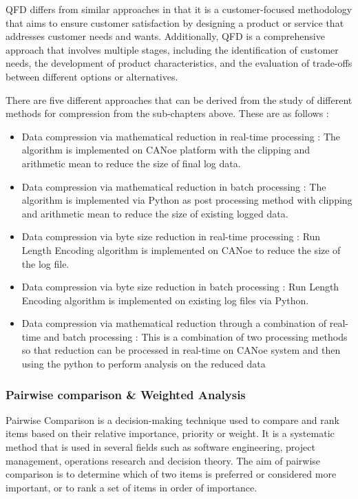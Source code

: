 QFD differs from similar approaches in that it is a customer-focused methodology that aims to ensure customer satisfaction by designing a product or service that addresses customer needs and wants. Additionally, QFD is a comprehensive approach that involves multiple stages, including the identification of customer needs, the development of product characteristics, and the evaluation of trade-offs between different options or alternatives.

There are five different approaches that can be derived from the study of different methods for compression from the sub-chapters above. These are as follows : 

\begin{itemize}
    \item Data compression via mathematical reduction in real-time processing : The algorithm is implemented on CANoe platform with the clipping and arithmetic mean to reduce the size of final log data.

    \item Data compression via mathematical reduction in batch processing : The algorithm is implemented via Python as post processing method with clipping and arithmetic mean to reduce the size of existing logged data.

    \item Data compression via byte size reduction in real-time processing : Run Length Encoding algorithm is implemented on CANoe to reduce the size of the log file.

    \item Data compression via byte size reduction in batch processing : Run Length Encoding algorithm is implemented on existing log files via Python.

    \item Data compression via mathematical reduction through a combination of real-time and batch processing : This is a combination of two processing methods so that reduction can be processed in real-time on CANoe system and then using the python to perform analysis on the reduced data
\end{itemize}


\subsubsection{Pairwise comparison \& Weighted Analysis} 

Pairwise Comparison is a decision-making technique used to compare and rank items based on their relative importance, priority or weight. It is a systematic method that is used in several fields such as software engineering, project management, operations research and decision theory. The aim of pairwise comparison is to determine which of two items is preferred or considered more important, or to rank a set of items in order of importance.

